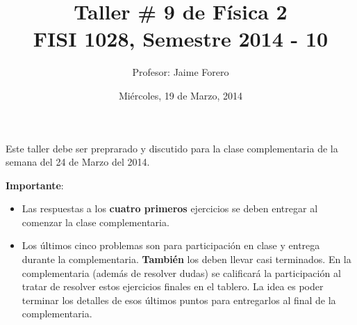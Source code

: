 \documentclass{article}
\title{Taller \# 9 de F\'isica 2\\ FISI 1028, Semestre 2014 - 10}
\author{Profesor: Jaime Forero}
\date{Mi\'ercoles, 19 de Marzo, 2014}
\begin{document}
\maketitle
\thispagestyle{empty}

\noindent

Este taller debe ser preprarado y discutido para la clase
complementaria de la semana del 24 de Marzo del 2014. 

\noindent
{\bf Importante}:
\begin{itemize}

\item
Las respuestas a los {\bf cuatro primeros} ejercicios se deben entregar
al comenzar la clase complementaria. 
\item 

Los \'ultimos cinco problemas son para participaci\'on en clase y entrega
durante la complementaria. {\bf{Tambi\'en}} los deben llevar casi
terminados. En la complementaria (adem\'as de resolver dudas) se
calificar\'a la participaci\'on al tratar de resolver estos ejercicios
finales en el tablero. La idea es poder terminar los  detalles de esos
\'ultimos puntos para entregarlos al final de la complementaria.
\end{itemize}
\end{document}
